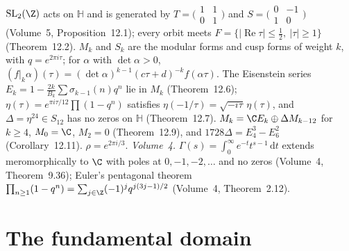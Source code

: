 \begin{reminder}
$\mathrm{SL}_2(\Z)$ acts on $\mathbb H$ and is generated by $T=\bigl(\begin{smallmatrix}1&1\\0&1\end{smallmatrix}\bigr)$ and $S=\bigl(\begin{smallmatrix}0&-1\\1&0\end{smallmatrix}\bigr)$
(Volume~5, Proposition~12.1); every orbit meets $F=\{|\operatorname{Re}\tau|\le\frac12,\ |\tau|\ge1\}$ (Theorem~12.2). $M_k$ and $S_k$ are the modular forms and cusp
forms of weight $k$, with $q=e^{2\pi i\tau}$; for $\alpha$ with $\det\alpha>0$, $(f|_k\alpha)(\tau)=(\det\alpha)^{k-1}(c\tau+d)^{-k}f(\alpha\tau)$. The Eisenstein series
$E_k=1-\frac{2k}{B_k}\sum\sigma_{k-1}(n)q^n$ lie in $M_k$ (Theorem~12.6); $\eta(\tau)=e^{\pi i\tau/12}\prod(1-q^n)$ satisfies $\eta(-1/\tau)=\sqrt{-i\tau}\,\eta(\tau)$, and
$\Delta=\eta^{24}\in S_{12}$ has no zeros on $\mathbb H$ (Theorem~12.7). $M_k=\C E_k\oplus\Delta M_{k-12}$ for $k\ge4$, $M_0=\C$, $M_2=0$ (Theorem~12.9), and
$1728\Delta=E_4^3-E_6^2$ (Corollary~12.11). $\rho=e^{2\pi i/3}$. \emph{Volume~4.} $\Gamma(s)=\int_0^\infty e^{-t}t^{s-1}\,\mathrm dt$ extends meromorphically to $\C$ with poles at
$0,-1,-2,\dots$ and no zeros (Volume~4, Theorem~9.36); Euler's pentagonal theorem $\prod_{n\ge1}(1-q^n)=\sum_{j\in\Z}(-1)^jq^{j(3j-1)/2}$ (Volume~4, Theorem~2.12).
\end{reminder}

\section{The fundamental domain}

